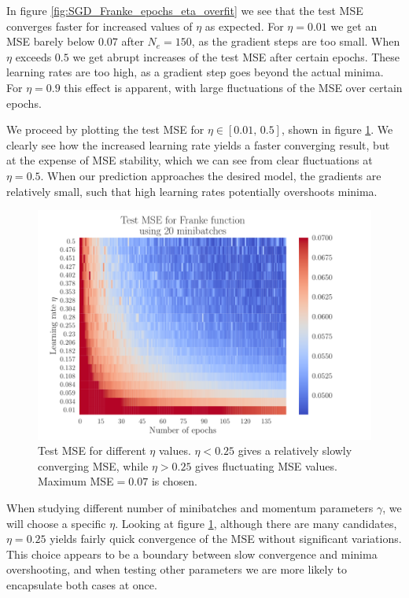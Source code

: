 \documentclass[12pt]{extarticle}
\begin{document}
In figure \ref{fig:SGD_Franke_epochs_eta_overfit} we see that the test MSE converges faster for increased values of $\eta$ as expected. For $\eta=0.01$ we get an MSE barely below $0.07$ after $N_e=150$, as the gradient steps are too small. When $\eta$ exceeds $0.5$ we get abrupt increases of the test MSE after certain epochs. These learning rates are too high, as a gradient step goes beyond the actual minima. For $\eta=0.9$ this effect is apparent, with large fluctuations of the MSE over certain epochs.

We proceed by plotting the test MSE for $\eta\in[0.01,\,0.5]$, shown in figure \ref{fig:SGD_Franke_epochs_eta}. We clearly see how the increased learning rate yields a faster converging result, but at the expense of MSE stability, which we can see from clear fluctuations at $\eta=0.5$. When our prediction approaches the desired model, the gradients are relatively small, such that high learning rates potentially overshoots minima.

\begin{figure}[h!]
	\includegraphics[width=0.9\linewidth]{SGD_Franke/reg_Franke__epochs_eta__Test_MSE__262224.pdf}
	\caption{Test MSE for different $\eta$ values. $\eta<0.25$ gives a relatively slowly converging MSE, while $\eta>0.25$ gives fluctuating MSE values. Maximum MSE$=0.07$ is chosen.}
	\label{fig:SGD_Franke_epochs_eta}
\end{figure}

When studying different number of minibatches and momentum parameters $\gamma$, we will choose a specific $\eta$. Looking at figure \ref{fig:SGD_Franke_epochs_eta}, although there are many candidates, $\eta=0.25$ yields fairly quick convergence of the MSE without significant variations. This choice appears to be a boundary between slow convergence and minima overshooting, and when testing other parameters we are more likely to encapsulate both cases at once.
\end{document}
